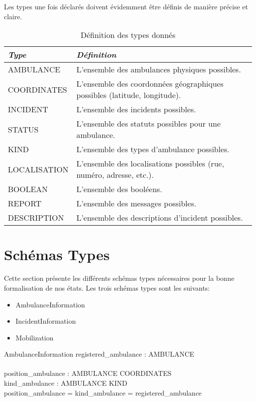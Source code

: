 \documentclass{report}
\begin{document}
Les types une fois déclarés doivent évidemment être définis de 
manière précise et claire. 
\begin{table}[!h]
\begin{minipage}{\marginparsep+\marginparwidth+\marginparpush+\textwidth}
	\begin{tabularx}{\textwidth}{|l|X|}
		\hline 
		\textit{Type} & \textit{Définition} \\
		\hline
		AMBULANCE & L'ensemble des ambulances physiques possibles. \\
		\hline
		COORDINATES & L'ensemble des coordonnées géographiques possibles (latitude, longitude). \\
		\hline
		INCIDENT & L'ensemble des incidents possibles. \\
		\hline
		STATUS & L'ensemble des statuts possibles pour une ambulance. \\
		\hline
		KIND & L'ensemble des types d'ambulance possibles. \\
		\hline
		LOCALISATION & L'ensemble des localisations possibles (rue, numéro, adresse, etc.). \\
		\hline
		BOOLEAN & L'ensemble des booléens. \\
		\hline
		REPORT & L'ensemble des messages possibles. \\
		\hline
		DESCRIPTION & L'ensemble des descriptions d'incident possibles. \\
		\hline
	\end{tabularx}
	\caption{Définition des types donnés}\label{tab:typedefinition}
\end{minipage}
\end{table}

\section{Schémas Types}\label{sec:sctype}
Cette section présente les différents schémas types nécessaires pour la 
bonne formalisation de nos états. Les trois schémas types sont 
les suivants: 
\begin{itemize}
	\item AmbulanceInformation
	\item IncidentInformation
	\item Mobilization
\end{itemize}

\begin{schema}{AmbulanceInformation}
 	registered\_ambulance : \power AMBULANCE \\
	\newline \\
 	position\_ambulance : AMBULANCE \pinj COORDINATES \\
 	kind\_ambulance : AMBULANCE \pfun KIND \\
  \where
  	\dom position\_ambulance = \dom kind\_ambulance = registered\_ambulance
\end{schema}
\end{document}
